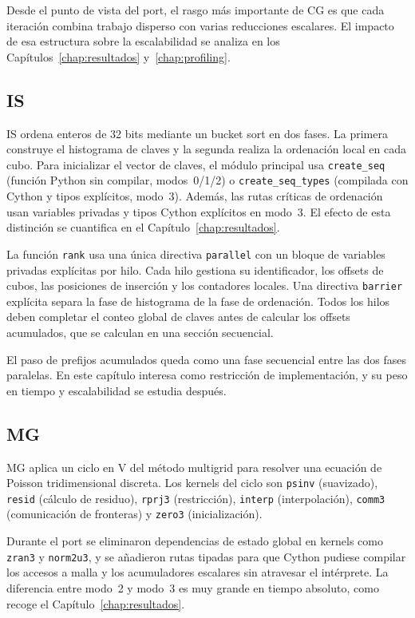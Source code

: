 Desde el punto de vista del port, el rasgo más importante de CG es que cada
iteración combina trabajo disperso con varias reducciones escalares. El impacto
de esa estructura sobre la escalabilidad se analiza en los
Capítulos~\ref{chap:resultados} y~\ref{chap:profiling}.

\subsection{IS}
IS ordena enteros de 32 bits mediante un bucket sort en dos fases. La primera
construye el histograma de claves y la segunda realiza la ordenación local en
cada cubo. Para inicializar el vector de claves, el módulo principal usa
\texttt{create\_seq} (función Python sin compilar, modos~0/1/2) o
\texttt{create\_seq\_types} (compilada con Cython y tipos explícitos, modo~3).
Además, las rutas críticas de ordenación usan variables privadas y tipos Cython
explícitos en modo~3. El efecto de esta distinción se cuantifica en el
Capítulo~\ref{chap:resultados}.

La función \texttt{rank} usa una única directiva \texttt{parallel} con un
bloque de variables privadas explícitas por hilo. Cada hilo gestiona su
identificador, los offsets de cubos, las posiciones de inserción y los
contadores locales. Una directiva
\texttt{barrier} explícita separa la fase de histograma de la fase de
ordenación. Todos los hilos deben completar el conteo global de claves antes de
calcular los offsets acumulados, que se calculan en una sección secuencial.

El paso de prefijos acumulados queda como una fase secuencial entre las dos fases
paralelas. En este capítulo interesa como restricción de implementación, y su peso
en tiempo y escalabilidad se estudia después.

\subsection{MG}
MG aplica un ciclo en V del método multigrid para resolver una ecuación de
Poisson tridimensional discreta. Los kernels del ciclo son \texttt{psinv}
(suavizado), \texttt{resid} (cálculo de residuo), \texttt{rprj3} (restricción),
\texttt{interp} (interpolación), \texttt{comm3} (comunicación de fronteras) y
\texttt{zero3} (inicialización).

Durante el port se eliminaron dependencias de estado global en kernels como
\texttt{zran3} y \texttt{norm2u3}, y se añadieron rutas tipadas para que Cython
pudiese compilar los accesos a malla y los acumuladores escalares sin atravesar
el intérprete. La diferencia entre modo~2 y modo~3 es muy grande en tiempo
absoluto, como recoge el Capítulo~\ref{chap:resultados}.

